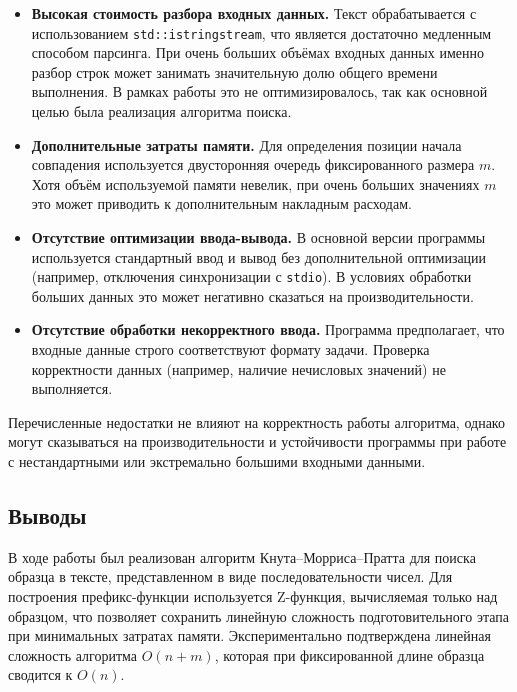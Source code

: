 \documentclass[12pt]{article}
\begin{document}
\begin{itemize}
	\item \textbf{Высокая стоимость разбора входных данных.}  
	Текст обрабатывается с использованием \texttt{std::istringstream}, что является достаточно медленным способом парсинга. При очень больших объёмах входных данных именно разбор строк может занимать значительную долю общего времени выполнения. В рамках работы это не оптимизировалось, так как основной целью была реализация алгоритма поиска.
	
	\item \textbf{Дополнительные затраты памяти.}  
	Для определения позиции начала совпадения используется двусторонняя очередь фиксированного размера $m$. Хотя объём используемой памяти невелик, при очень больших значениях $m$ это может приводить к дополнительным накладным расходам.
	
	\item \textbf{Отсутствие оптимизации ввода-вывода.}  
	В основной версии программы используется стандартный ввод и вывод без дополнительной оптимизации (например, отключения синхронизации с \texttt{stdio}). В условиях обработки больших данных это может негативно сказаться на производительности.
	
	\item \textbf{Отсутствие обработки некорректного ввода.}  
	Программа предполагает, что входные данные строго соответствуют формату задачи. Проверка корректности данных (например, наличие нечисловых значений) не выполняется.
	
\end{itemize}

Перечисленные недостатки не влияют на корректность работы алгоритма, однако могут сказываться на производительности и устойчивости программы при работе с нестандартными или экстремально большими входными данными. 

\subsection*{Выводы}

В ходе работы был реализован алгоритм Кнута--Морриса--Пратта для поиска образца в тексте, представленном в виде последовательности чисел. Для построения префикс-функции используется Z-функция, вычисляемая только над образцом, что позволяет сохранить линейную сложность подготовительного этапа при минимальных затратах памяти. Экспериментально подтверждена линейная сложность алгоритма $O(n + m)$, которая при фиксированной длине образца сводится к $O(n)$.
\end{document}
